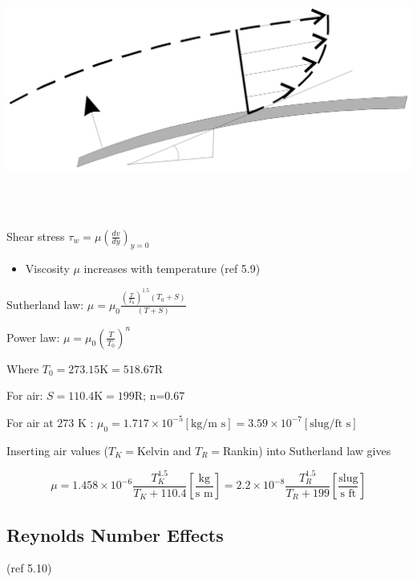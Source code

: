 \documentclass[
]{book}
\providecommand{\tightlist}{%
  \setlength{\itemsep}{0pt}\setlength{\parskip}{0pt}}
\begin{document}
\includegraphics[width=7.825in,height=3.25in]{media/05/image25.svg}

Shear stress \(\tau_w = \mu \left( \frac{dv}{dy} \right)_{y=0}\)

\begin{itemize}
\tightlist
\item
  Viscosity \(\mu\) increases with temperature (ref 5.9)
\end{itemize}

Sutherland law: \(\mu = \mu_0 \frac{\left( \frac{T}{T_0} \right)^{1.5} \left( T_0 + S \right)}{\left( T + S \right)}\)

Power law: \(\mu = \mu_0 \left( \frac{T}{T_0} \right)^n\)

Where \(T_0 = 273.15 \text{K} = 518.67 \text{R}\)

For air: \(S = 110.4 \text{K} = 199 \text{R} \text{; n=0.67}\)

For air at \(273\) K : \(\mu_0 = 1.717 \times 10^{-5} \left[\text{kg/m s}\right] = 3.59 \times 10^{-7} \left[\text{slug/ft s}\right]\)

Inserting air values (\(T_K=\)Kelvin and \(T_R=\)Rankin) into Sutherland law gives

\[\mu = 1.458 \times 10^{-6} \frac{T_K^{1.5}}{T_K+110.4} \left[\frac{\text{kg}}{\text{s m}}\right] = 2.2 \times 10^{-8} \frac{T_R^{1.5}}{T_R+199} \left[\frac{\text{slug}}{\text{s ft}}\right]\]

\hypertarget{reynolds-number-effects}{%
\subsection{Reynolds Number Effects}\label{reynolds-number-effects}}

(ref 5.10)
\end{document}
